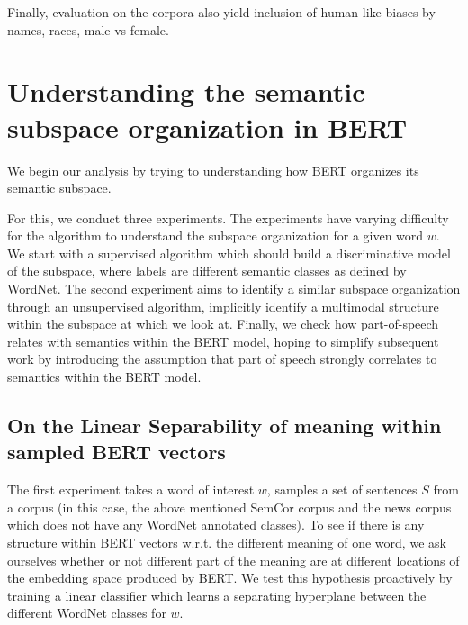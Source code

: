 \documentclass[a4paper,12pt,twoside,openright]{report}
\begin{document}
Finally, evaluation on the corpora also yield inclusion of human-like biases \cite{jentzsch19} by names, races, male-vs-female.

\chapter{Understanding the semantic subspace organization in BERT}\label{section:Understand_BERT}\label{section:UnderstandingBERT} 


We begin our analysis by trying to understanding how BERT organizes its semantic subspace.

For this, we conduct three experiments.
The experiments have varying difficulty for the algorithm to understand the subspace organization for a given word $w$.
We start with a supervised algorithm which should build a discriminative model of the subspace, where labels are different semantic classes as defined by WordNet.
The second experiment aims to identify a similar subspace organization through an unsupervised algorithm, implicitly identify a multimodal structure within the subspace at which we look at.
Finally, we check how part-of-speech relates with semantics within the BERT model, hoping to simplify subsequent work by introducing the assumption that part of speech strongly correlates to semantics within the BERT model.



\section{On the Linear Separability of meaning within sampled BERT vectors}

The first experiment takes a word of interest $w$, samples a set of sentences $S$ from a corpus (in this case, the above mentioned SemCor corpus and the news corpus \cite{news_corpus} which does not have any WordNet annotated classes).
To see if there is any structure within BERT vectors w.r.t. the different meaning of one word, we ask ourselves whether or not different part of the meaning are at different locations of the embedding space produced by BERT.
We test this hypothesis proactively by training a linear classifier which learns a separating hyperplane between the different WordNet classes for $w$.
\end{document}
